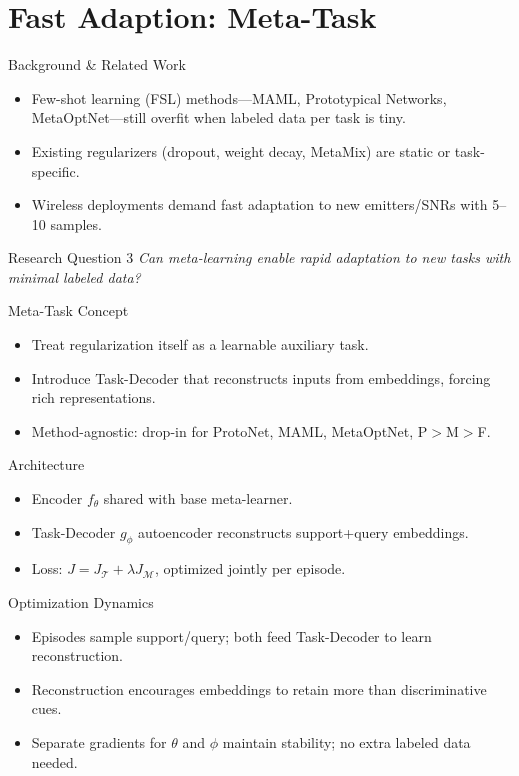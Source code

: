\section{Fast Adaption: Meta-Task}

\begin{frame}{Background \& Related Work}
    \begin{itemize}
        \item Few-shot learning (FSL) methods—MAML, Prototypical Networks, MetaOptNet—still overfit when labeled data per task is tiny.
        \item Existing regularizers (dropout, weight decay, MetaMix) are static or task-specific.
        \item Wireless deployments demand fast adaptation to new emitters/SNRs with 5–10 samples.
    \end{itemize}
\end{frame}

\begin{frame}{Research Question 3}
    \centering
    \Large
    \textit{Can meta-learning enable rapid adaptation to new tasks with minimal labeled data?}
\end{frame}

\begin{frame}{Meta-Task Concept}
    \begin{itemize}
        \item Treat regularization itself as a learnable auxiliary task.
        \item Introduce Task-Decoder that reconstructs inputs from embeddings, forcing rich representations.
        \item Method-agnostic: drop-in for ProtoNet, MAML, MetaOptNet, P$>$M$>$F.
    \end{itemize}
\end{frame}

\begin{frame}{Architecture}
    \begin{itemize}
        \item Encoder $f_{\theta}$ shared with base meta-learner.
        \item Task-Decoder $g_{\phi}$ autoencoder reconstructs support+query embeddings.
        \item Loss: $J = J_{\mathcal{T}} + \lambda J_{\mathcal{M}}$, optimized jointly per episode.
    \end{itemize}
\end{frame}

\begin{frame}{Optimization Dynamics}
    \begin{itemize}
        \item Episodes sample support/query; both feed Task-Decoder to learn reconstruction.
        \item Reconstruction encourages embeddings to retain more than discriminative cues.
        \item Separate gradients for $\theta$ and $\phi$ maintain stability; no extra labeled data needed.
    \end{itemize}
\end{frame}

